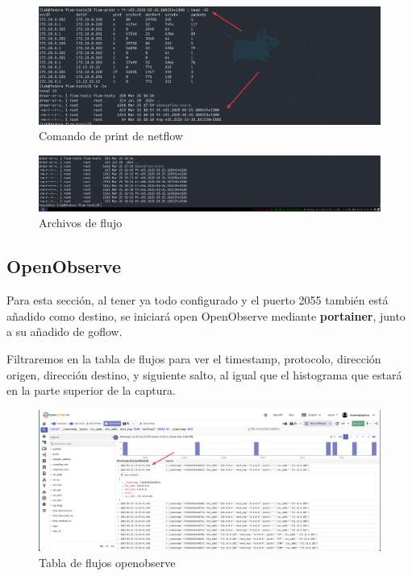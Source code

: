 \documentclass[11pt]{article}
\begin{document}
\begin{figure}[h]
    \centering
    \includegraphics[width=\textwidth]{src/flowprint.png}
    \caption{Comando de print de netflow}
\end{figure}
\begin{figure}[h]
    \centering
    \includegraphics[width=\textwidth]{src/lsflow.png}
    \caption{Archivos de flujo}
\end{figure}

\newpage 

\subsection{OpenObserve}

Para esta sección, al tener ya todo configurado y el puerto 2055 también está añadido como destino, se iniciará open OpenObserve mediante \textbf{portainer}, junto a su añadido de goflow. 

Filtraremos en la tabla de flujos para ver el timestamp, protocolo, dirección origen, dirección destino, y siguiente salto, al igual que el histograma que estará en la parte superior de la captura.


\begin{figure}[h]
    \centering
    \includegraphics[width=\textwidth]{src/flujos.png}
    \caption{Tabla de flujos openobserve}
\end{figure}
\end{document}

